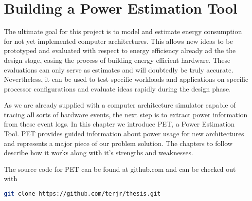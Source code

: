 \chapter{Building a Power Estimation Tool}

The ultimate goal for this project is to model and estimate energy consumption
for not yet implemented computer architectures. This allows new ideas to be prototyped
and evaluated with respect to energy efficiency already ad the the design stage,
easing the process of building energy efficient hardware. These evaluations can
only serve as estimates and will doubtedly be truly accurate. Nevertheless, it
can be used to test specific workloads and applications on specific processor
configurations and evaluate ideas rapidly during the design phase.

As we are already supplied with a computer architecture simulator capable of
tracing all sorts of hardware events, the next step is to extract power
information from these event logs. In this chapter we introduce PET, a Power
Estimation Tool. PET provides guided information about power usage for new
architectures and represents a major piece of our problem solution. The
chapters to follow describe how it works along with it's strengths and
weaknesses.

\noindent The source code for PET can be found at github.com and can be checked out with
\begin{lstlisting}[language=bash,numbers=none]
git clone https://github.com/terjr/thesis.git
\end{lstlisting}






